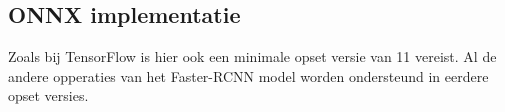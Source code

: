 \subsection{ONNX implementatie}
Zoals bij TensorFlow is hier ook een minimale opset versie van 11 vereist.
Al de andere opperaties van het Faster-RCNN model worden ondersteund in eerdere opset versies.
